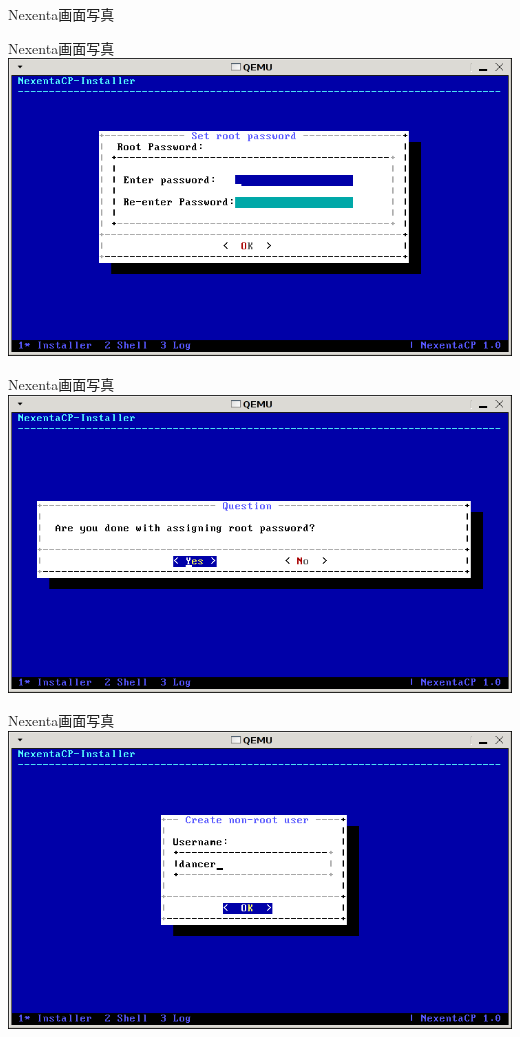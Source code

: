 \documentclass[cjk,dvipdfmx,12pt]{beamer}
\begin{document}
\begin{frame}{Nexenta画面写真}
\end{frame}\begin{frame}{Nexenta画面写真} 
\includegraphics[width=1.0\hsize]{image200804/nexenta10.png}
\end{frame}\begin{frame}{Nexenta画面写真} 
\includegraphics[width=1.0\hsize]{image200804/nexenta11.png}
\end{frame}\begin{frame}{Nexenta画面写真} 
\includegraphics[width=1.0\hsize]{image200804/nexenta12.png}

\end{frame}
\end{document}

